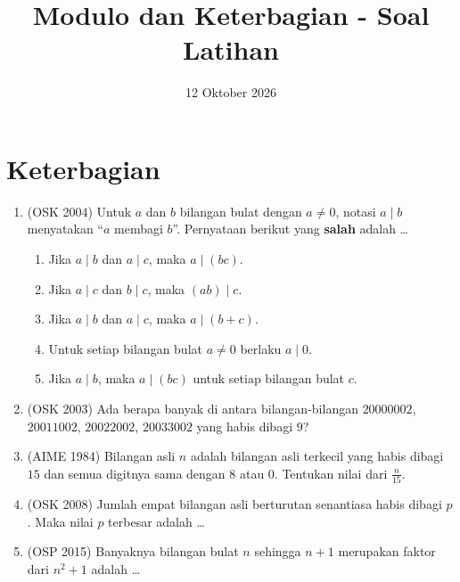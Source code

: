 \documentclass[12pt]{scrartcl}
\title{Modulo dan Keterbagian - Soal Latihan}
\date{12 Oktober 2026}
\begin{document}
\maketitle

\renewcommand*\contentsname{Daftar Isi}
\tableofcontents

\newpage

\section{Keterbagian}
\begin{enumerate}

	\item (OSK 2004)
	Untuk $a$ dan $b$ bilangan bulat dengan $a \ne 0$, notasi $a \mid b$ menyatakan
	``$a$ membagi $b$''. Pernyataan berikut yang \textbf{salah} adalah \dots
	\begin{enumerate}
		\item Jika $a \mid b$ dan $a \mid c$, maka $a \mid (bc)$.
		\item Jika $a \mid c$ dan $b \mid c$, maka $(ab) \mid c$.
		\item Jika $a \mid b$ dan $a \mid c$, maka $a \mid (b + c)$.
		\item Untuk setiap bilangan bulat $a \ne 0$ berlaku $a \mid 0$.
		\item Jika $a \mid b$, maka $a \mid (bc)$ untuk setiap bilangan bulat $c$.
	\end{enumerate}

	\item (OSK 2003)
	Ada berapa banyak di antara bilangan-bilangan $20000002$, $20011002$,
	$20022002$, $20033002$ yang habis dibagi $9$?

	\item (AIME 1984)
	Bilangan asli $n$ adalah bilangan asli terkecil yang habis dibagi $15$
	dan semua digitnya sama dengan $8$ atau $0$. Tentukan nilai dari $\frac{n}{15}$.

	\item (OSK 2008)
	Jumlah empat bilangan asli berturutan senantiasa habis dibagi $p$.
	Maka nilai $p$ terbesar adalah \dots

	\item (OSP 2015)
	Banyaknya bilangan bulat $n$ sehingga $n + 1$ merupakan faktor dari $n^2 + 1$ adalah \dots


\end{enumerate}
\end{document}
